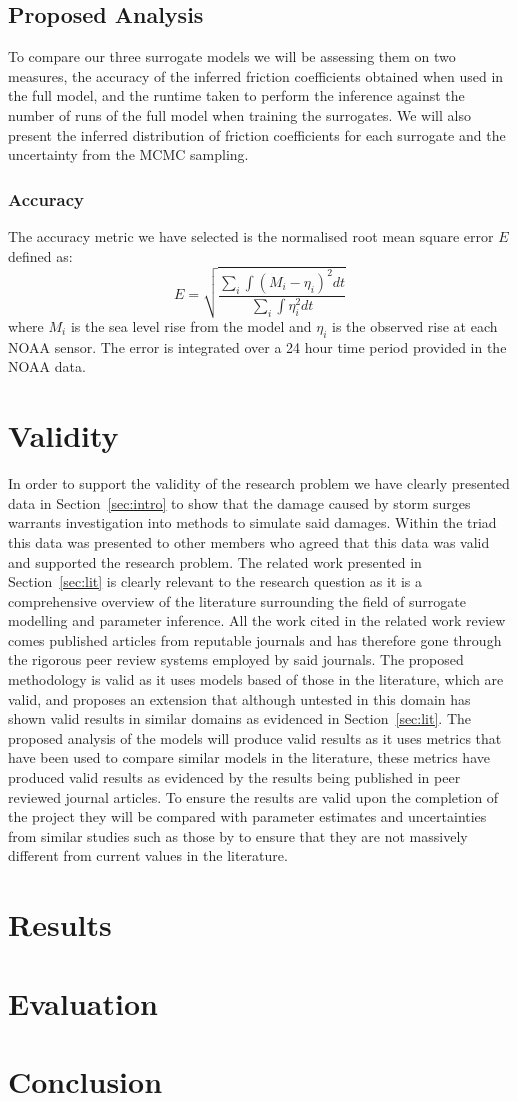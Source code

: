 \documentclass[12pt,a4paper]{article}
\begin{document}
\subsection{Proposed Analysis}
\noindent
To compare our three surrogate models we will be assessing them on two measures, the accuracy of the inferred friction coefficients obtained when used in the full model, and the runtime taken to perform the inference against the number of runs of the full model when training the surrogates. We will also present the inferred distribution of friction coefficients for each surrogate and the uncertainty from the MCMC sampling.
\subsubsection{Accuracy}
\noindent
The accuracy metric we have selected is the normalised root mean square error $E$ defined as:
\begin{equation}
	E=\sqrt{\frac{\sum_{i}\int(M_i-\eta_i)^2dt}{\sum_{i}\int\eta^2_idt}}
\end{equation}
where $M_i$ is the sea level rise from the model and $\eta_i$ is the observed rise at each NOAA sensor. The error is integrated over a 24 hour time period provided in the NOAA data.
\section{Validity}\label{sec:val}
\noindent
In order to support the validity of the research problem we have clearly presented data in Section~\ref{sec:intro} to show that the damage caused by storm surges warrants investigation into methods to simulate said damages. Within the triad this data was presented to other members who agreed that this data was valid and supported the research problem. The related work presented in Section~\ref{sec:lit} is clearly relevant to the research question as it is a comprehensive overview of the literature surrounding the field of surrogate modelling and parameter inference. All the work cited in the related work review comes published articles from reputable journals and has therefore gone through the rigorous peer review systems employed by said journals. The proposed methodology is valid as it uses models based of those in the literature, which are valid, and proposes an extension that although untested in this domain has shown valid results in similar domains as evidenced in Section~\ref{sec:lit}. The proposed analysis of the models will produce valid results as it uses metrics that have been used to compare similar models in the literature, these metrics have produced valid results as evidenced by the results being published in peer reviewed journal articles. To ensure the results are valid upon the completion of the project they will be compared with parameter estimates and uncertainties from similar studies such as those by  to ensure that they are not massively different from current values in the literature.
\section{Results}
\noindent
\section{Evaluation}
\noindent
\section{Conclusion}
\noindent

\end{document}
